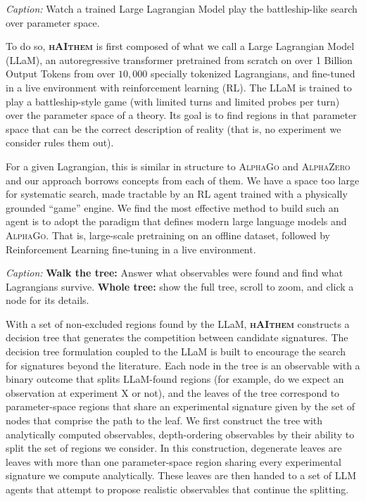 \documentclass[11pt]{article}
\newcommand{\haithem}{\textbf{\textsc{hAIthem}}}
\newcommand{\interactive}[3][]{%
  \begin{tcolorbox}[colback=orange!5,colframe=orange!60!black,
                    title={Interactive: \texttt{#2}\ifx\relax#1\relax\else\ (#1)\fi}]
  \emph{Caption:} #3
  \end{tcolorbox}}
\begin{document}
\interactive{param3d}{Watch a trained Large Lagrangian Model play the
battleship-like search over parameter space.}

To do so, \haithem{} is first composed of what we call a Large Lagrangian Model (LLaM), an autoregressive transformer pretrained from scratch on over 1 Billion Output Tokens from over $10,000$ specially tokenized Lagrangians, and fine-tuned in a live environment with reinforcement learning (RL). The LLaM is trained to play a battleship-style game (with limited turns and limited probes per turn) over the parameter space of a theory. Its goal is to find regions in that parameter space that can be the correct description of reality (that is, no experiment we consider rules them out).

For a given Lagrangian, this is similar in structure to \textsc{AlphaGo} and \textsc{AlphaZero} \cite{silvergo,SilverGo2,doi:10.1126/science.aar6404} and our approach borrows concepts from each of them. We have a space too large for systematic search, made tractable by an RL agent trained with a physically grounded “game” engine. We find the most effective method to build such an agent is to adopt the paradigm that defines modern large language models and \textsc{AlphaGo}. That is, large-scale pretraining on an offline dataset, followed by Reinforcement Learning fine-tuning in a live environment.

\interactive{tree}{\textbf{Walk the tree:} Answer what observables were found
and find what Lagrangians survive. \textbf{Whole tree:} show the full tree,
scroll to zoom, and click a node for its details.}

With a set of non-excluded regions found by the LLaM, \haithem{} constructs a decision tree that generates the competition between candidate signatures. The decision tree formulation coupled to the LLaM is built to encourage the search for signatures beyond the literature. Each node in the tree is an observable with a binary outcome that splits LLaM-found regions (for example, do we expect an observation at experiment X or not), and the leaves of the tree correspond to parameter-space regions that share an experimental signature given by the set of nodes that comprise the path to the leaf. We first construct the tree with analytically computed observables, depth-ordering observables by their ability to split the set of regions we consider. In this construction, degenerate leaves are leaves with more than one parameter-space region sharing every experimental signature we compute analytically. These leaves are then handed to a set of LLM agents that attempt to propose realistic observables that continue the splitting. 
\end{document}
